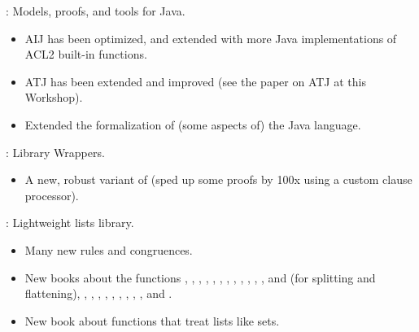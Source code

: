 
\begin{frame}

\implibtitle

:
Models, proofs, and tools for Java.
\begin{itemize}
\item AIJ has been optimized,
      and extended with more Java implementations of ACL2 built-in functions.
\item ATJ has been extended and improved
      (see the paper on ATJ at this Workshop).
\item Extended the formalization of (some aspects of) the Java language.
\end{itemize}

\end{frame}


\begin{frame}

\implibtitle

:
Library Wrappers.
\begin{itemize}
\item A new, robust variant of  (sped up some proofs by 100x
      using a custom clause processor).
\end{itemize}

\end{frame}


\begin{frame}

\implibtitle

:
Lightweight lists library.
\begin{itemize}
\item Many new rules and congruences.
\item New books about the functions ,
      , , ,
      , , ,
      , , ,
      , , 
      and  (for splitting and flattening),
      , , ,
      , , ,
      , , , and
      .
\item New book about functions that treat lists like sets.
\end{itemize}

\end{frame}

